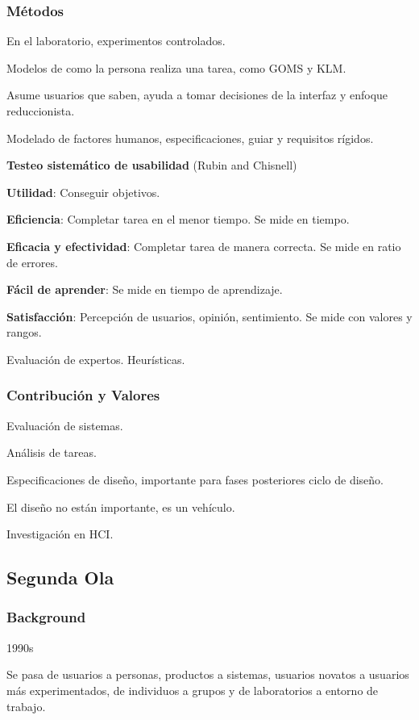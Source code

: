 \documentclass[12pt, twoside, openright]{report} %
\begin{document}
\subsubsection{Métodos}

En el laboratorio, experimentos controlados.

Modelos de como la persona realiza una tarea, como GOMS y KLM.

Asume usuarios que saben, ayuda a tomar decisiones de la interfaz y
enfoque reduccionista.

Modelado de factores humanos, especificaciones, guiar y requisitos
rígidos.

\textbf{Testeo sistemático de usabilidad} (Rubin and Chisnell)

\textbf{Utilidad}: Conseguir objetivos.

\textbf{Eficiencia}: Completar tarea en el menor tiempo. Se mide en
tiempo.

\textbf{Eficacia y efectividad}: Completar tarea de manera correcta. Se
mide en ratio de errores.

\textbf{Fácil de aprender}: Se mide en tiempo de aprendizaje.

\textbf{Satisfacción}: Percepción de usuarios, opinión, sentimiento. Se
mide con valores y rangos.

Evaluación de expertos. Heurísticas.

\subsubsection{Contribución y Valores}

Evaluación de sistemas.

Análisis de tareas.

Especificaciones de diseño, importante para fases posteriores ciclo de
diseño.

El diseño no están importante, es un vehículo.

Investigación en HCI.

\subsection{Segunda Ola}

\subsubsection{Background}

1990s

Se pasa de usuarios a personas, productos a sistemas, usuarios novatos a
usuarios más experimentados, de individuos a grupos y de laboratorios a
entorno de trabajo.
\end{document}
